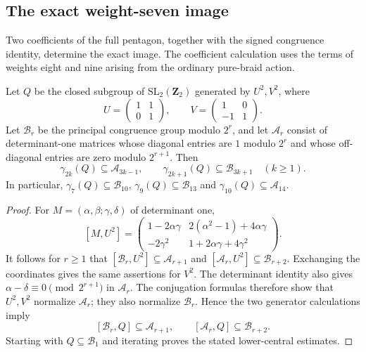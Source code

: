 \subsection{The exact weight-seven image}
\label{subsec:weight-seven-exact}

Two coefficients of the full pentagon, together with the signed
congruence identity, determine the exact image. The coefficient calculation uses the terms of
weights eight and nine arising from the ordinary pure-braid action.

\begin{lemma}
\label{lem:weight-seven-matrix-filtration}
Let $Q$ be the closed subgroup of $\mathrm{SL}_2(\mathbf Z_2)$
generated by $U^2,V^2$, where
\[
 U=\begin{pmatrix}1&1\\0&1\end{pmatrix},\qquad
 V=\begin{pmatrix}1&0\\-1&1\end{pmatrix}.
\]
Let $\mathcal B_r$ be the principal congruence group modulo $2^r$,
and let $\mathcal A_r$ consist of determinant-one matrices whose
diagonal entries are $1$ modulo $2^r$ and whose off-diagonal
entries are zero modulo $2^{r+1}$. Then
\[
 \gamma_{2k}(Q)\subseteq\mathcal A_{3k-1},\qquad
 \gamma_{2k+1}(Q)\subseteq\mathcal B_{3k+1}\quad(k\ge1).
\]
In particular, $\gamma_7(Q)\subseteq\mathcal B_{10}$,
$\gamma_9(Q)\subseteq\mathcal B_{13}$ and
$\gamma_{10}(Q)\subseteq\mathcal A_{14}$.
\end{lemma}

\begin{proof}
For $M=(\alpha,\beta;\gamma,\delta)$ of determinant one,
\[
 [M,U^2]=
 \begin{pmatrix}
 1-2\alpha\gamma&2(\alpha^2-1)+4\alpha\gamma\\
 -2\gamma^2&1+2\alpha\gamma+4\gamma^2
 \end{pmatrix}.
\]
It follows for $r\ge1$ that
$[\mathcal B_r,U^2]\subseteq\mathcal A_{r+1}$ and
$[\mathcal A_r,U^2]\subseteq\mathcal B_{r+2}$.
Exchanging the coordinates gives the same assertions for $V^2$.
The determinant identity also gives
$\alpha-\delta\equiv0\pmod{2^{r+1}}$ in $\mathcal A_r$.
The conjugation formulas therefore show that $U^2,V^2$ normalize
$\mathcal A_r$; they also normalize $\mathcal B_r$.
Hence the two generator calculations imply
\[
 [\mathcal B_r,Q]\subseteq\mathcal A_{r+1},\qquad
 [\mathcal A_r,Q]\subseteq\mathcal B_{r+2}.
\]
Starting with $Q\subseteq\mathcal B_1$ and iterating proves the
stated lower-central estimates.
\end{proof}

